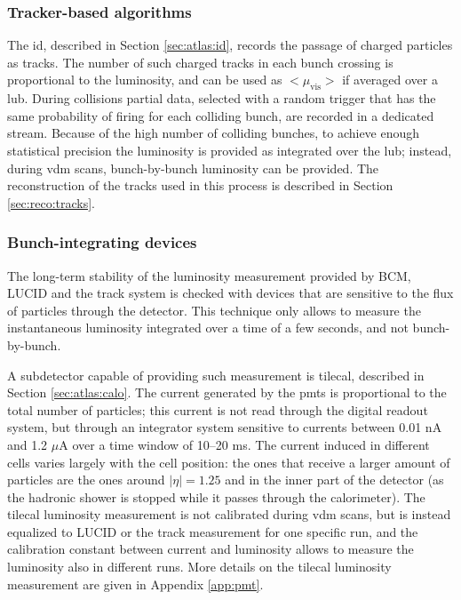 
\subsubsection*{Tracker-based algorithms}

The \gls{id}, described in Section \ref{sec:atlas:id}, records the passage of charged particles as tracks. The number of such charged tracks in each bunch crossing is proportional to the luminosity, and can be used as ${<}\mu_\mathrm{vis}{>}$ if averaged over a \gls{lub}. 
During collisions partial data, selected with a random trigger that has the same probability of firing for each colliding bunch, are recorded in a dedicated stream. Because of the high number of colliding bunches, to achieve enough statistical precision the luminosity is provided as integrated over the \gls{lub}; instead, during \gls{vdm} scans, bunch-by-bunch luminosity can be provided. 
The reconstruction of the tracks used in this process is described in Section \ref{sec:reco:tracks}.

\subsubsection*{Bunch-integrating devices}

The long-term stability of the luminosity measurement provided by BCM, LUCID and the track system is checked with devices that are sensitive to the flux of particles through the detector. This technique only allows to measure the instantaneous luminosity integrated over a time of a few seconds, and not bunch-by-bunch.

A subdetector capable of providing such measurement is \gls{tilecal}, described in Section \ref{sec:atlas:calo}. The current generated by the \glspl{pmt} is proportional to the total number of particles; this current is not read through the digital readout system, but through an integrator system sensitive to currents between 0.01 nA and 1.2 $\mu$A over a time window of 10--20 ms. The current induced in different cells varies largely with the cell position: the ones that receive a larger amount of particles are the ones around $|\eta|=1.25$ and in the inner part of the detector (as the hadronic shower is stopped while it passes through the calorimeter). The \gls{tilecal} luminosity measurement is not calibrated during \gls{vdm} scans, but is instead equalized to LUCID or the track measurement for one specific run, and the calibration constant between current and luminosity allows to measure the luminosity also in different runs. More details on the \gls{tilecal} luminosity measurement are given in 
Appendix \ref{app:pmt}. 

